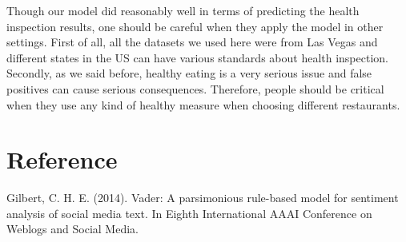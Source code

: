 \documentclass[letterpaper, 11 pt, conference]{ieeeconf}
\begin{document}
Though our model did reasonably well in terms of predicting the health inspection results, one should be careful when they apply the model in other settings. First of all, all the datasets we used here were from Las Vegas and different states in the US can have various standards about health inspection. Secondly, as we said before, healthy eating is a very serious issue and false positives can cause serious consequences. Therefore, people should be critical when they use any kind of healthy measure when choosing different restaurants. 


\section*{Reference}
Gilbert, C. H. E. (2014). Vader: A parsimonious rule-based model for sentiment analysis of social media text. In Eighth International AAAI Conference on Weblogs and Social Media.
\end{document}
